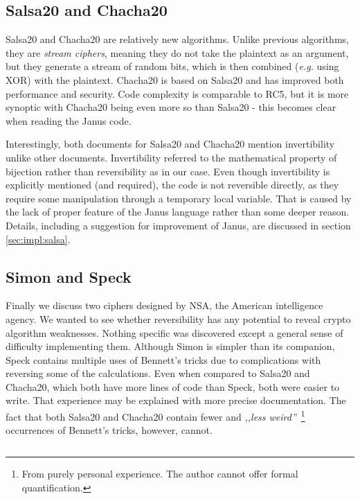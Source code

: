 \documentclass[a4paper,10pt,openright]{memoir}
\newcommand{\eg}{\emph{e.g.}\xspace}
\newcommand{\term}[1]{\textit{#1}}
\begin{document}
\subsection{Salsa20 and Chacha20}

Salsa20 and Chacha20 are relatively new algorithms. Unlike previous 
algorithms, they are \term{stream ciphers}, meaning they do not take 
the plaintext as an argument, but they generate a stream of random 
bits, which is then combined (\eg using XOR) with the plaintext. 
Chacha20 is based on Salsa20 and has improved both performance and 
security. Code complexity is comparable to RC5, but it is more synoptic 
with Chacha20 being even more so than Salsa20 - this becomes clear when 
reading the Janus code.

Interestingly, both documents for Salsa20 and Chacha20 mention 
invertibility unlike other documents. Invertibility referred to the 
mathematical property of bijection rather than reversibility as in 
our case. Even though invertibility is explicitly mentioned (and 
required), the code is not reversible directly, as they require some 
manipulation through a temporary local variable. That is caused by the 
lack of proper feature of the Janus language rather than some deeper 
reason. Details, including a suggestion for improvement of Janus, are 
discussed in section \ref{sec:impl:salsa}.

\subsection{Simon and Speck}

Finally we discuss two ciphers designed by NSA, the American 
intelligence agency. We wanted to see whether reversibility has any 
potential to reveal crypto algorithm weaknesses. Nothing specific was 
discovered except a general sense of difficulty implementing them. 
Although Simon is simpler than its companion, Speck contains multiple 
uses of Bennett's tricks due to complications with reversing some of 
the calculations. Even when compared to Salsa20 and Chacha20, which 
both have more lines of code than Speck, both were easier to write. 
That experience may be explained with more precise documentation. The 
fact that both Salsa20 and Chacha20 contain fewer and \textit{,,less 
weird''}~\footnote{From purely personal experience. The author cannot 
offer formal quantification.} occurrences of Bennett's tricks, however, 
cannot.

\begin{lstlisting}
\end{lstlisting}
\end{document}
